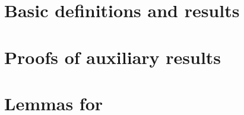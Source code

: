 
\section{Basic definitions and results}

\section{Proofs of auxiliary results}

\section{Lemmas for }


